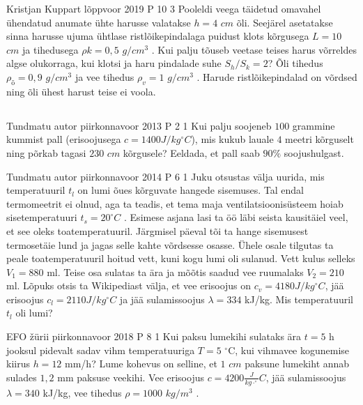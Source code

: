 \documentclass[11pt]{article}
\begin{document}
{%
{Kristjan Kuppart} %
{lõppvoor} %
{2019} %
{P 10} %
{3} %
{
\ifStatement
Pooleldi veega täidetud omavahel ühendatud anumate ühte harusse valatakse $h = 4$ $cm$ õli. Seejärel asetatakse sinna harusse ujuma ühtlase ristlõikepindalaga puidust klots kõrgusega $L = 10$ $cm$ ja tihedusega $\rho k = 0,5$ $g/cm^3$ . Kui palju tõuseb veetase teises harus võrreldes algse olukorraga, kui klotsi ja haru pindalade suhe $S_h / S_k = 2$? Õli tihedus $\rho_õ = 0,9$ $g/cm^3$ ja vee tihedus $\rho_v = 1$ $g/cm^3$ . Harude ristlõikepindalad on võrdsed ning õli ühest harust teise ei voola.
\fi
}
\newpage\subsection{\protect{}}

{Tundmatu autor} %
{piirkonnavoor} %
{2013} %
{P 2} %
{1} %
{
\ifStatement
Kui palju soojeneb $100$ grammine kummist pall (erisoojusega $c = 1400 J/kg^{\circ}C$), mis kukub lauale $4$ meetri kõrguselt ning põrkab tagasi $230$ $cm$ kõrgusele? Eeldada, et pall saab $90\%$ soojushulgast.
\fi
}

{Tundmatu autor} %
{piirkonnavoor} %
{2014} %
{P 6} %
{1} %
{
\ifStatement
Juku otsustas välja uurida, mis temperatuuril $t_l$ on lumi õues kõrguvate hangede sisemuses. Tal endal termomeetrit ei olnud, aga ta teadis, et tema maja ventilatsioonisüsteem hoiab sisetemperatuuri $t_s = 20 ^{\circ} C$ . Esimese asjana lasi ta öö läbi seista kausitäiel veel, et see oleks toatemperatuuril. Järgmisel päeval tõi ta hange sisemusest termosetäie lund ja jagas selle kahte võrdsesse osasse. Ühele osale tilgutas ta peale toatemperatuuril hoitud vett, kuni kogu lumi oli sulanud. Vett kulus selleks $V_1 = 880$ ml. Teise osa sulatas ta ära ja mõõtis saadud vee ruumalaks $V_2 = 210$ ml. Lõpuks otsis ta Wikipediast välja, et vee erisoojus on $c_v = 4180 J/kg^{\circ}C$, jää erisoojus $c_l = 2110 J/kg^{\circ}C$ ja jää sulamissoojus $\lambda = 334$ kJ/kg. Mis temperatuuril $t_l$ oli lumi?
\fi
}

{EFO žürii} %
{piirkonnavoor} %
{2018} %
{P 8} %
{1} %
{
\ifStatement
Kui paksu lumekihi sulataks ära $t = 5$ h jooksul pidevalt sadav vihm temperatuuriga $T = 5$ $^{\circ}$C, kui vihmavee kogunemise kiirus $h = 12$ mm/h? Lume kohevus on selline, et $1$ $cm$ paksune lumekiht annab sulades $1,2$ mm paksuse veekihi. Vee erisoojus $c = 4200 \frac{J}{kg \cdot ^{\circ}}C$, jää sulamissoojus $\lambda = 340$ kJ/kg, vee tihedus $\rho = 1000$ $kg/m^3$ .
\fi
}

}
\end{document}

